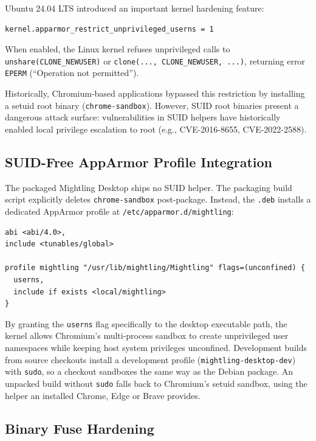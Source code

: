 \documentclass[11pt]{article}
\newcommand{\code}[1]{\texttt{#1}}
\begin{document}
Ubuntu 24.04 LTS introduced an important kernel hardening feature:
\begin{lstlisting}
kernel.apparmor_restrict_unprivileged_userns = 1
\end{lstlisting}
When enabled, the Linux kernel refuses unprivileged calls to \code{unshare(CLONE\_NEWUSER)} or
\code{clone(..., CLONE\_NEWUSER, ...)}, returning error \code{EPERM} (``Operation not permitted'').

Historically, Chromium-based applications bypassed this restriction by installing a setuid root binary
(\code{chrome-sandbox}). However, SUID root binaries present a dangerous attack surface: vulnerabilities in SUID
helpers have historically enabled local privilege escalation to root (e.g., CVE-2016-8655, CVE-2022-2588).

\subsection{SUID-Free AppArmor Profile Integration}

The packaged Mightling Desktop ships no SUID helper. The packaging build script explicitly deletes \code{chrome-sandbox}
post-package. Instead, the \code{.deb} installs a dedicated AppArmor profile at \code{/etc/apparmor.d/mightling}:
\begin{lstlisting}
abi <abi/4.0>,
include <tunables/global>

profile mightling "/usr/lib/mightling/Mightling" flags=(unconfined) {
  userns,
  include if exists <local/mightling>
}
\end{lstlisting}
By granting the \code{userns} flag specifically to the desktop executable path, the kernel allows Chromium's multi-process
sandbox to create unprivileged user namespaces while keeping host system privileges unconfined. Development builds from
source checkouts install a development profile (\code{mightling-desktop-dev}) with \code{sudo}, so a checkout sandboxes
the same way as the Debian package. An unpacked build without \code{sudo} falls back to Chromium's setuid sandbox,
using the helper an installed Chrome, Edge or Brave provides.

\subsection{Binary Fuse Hardening}
\end{document}
